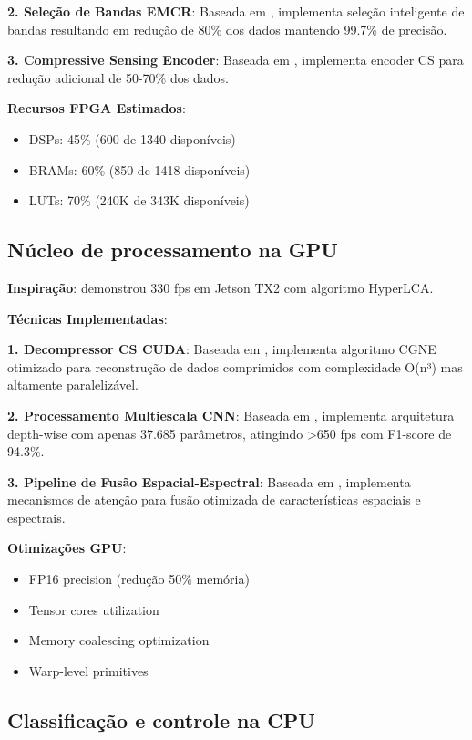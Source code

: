 \textbf{2. Seleção de Bandas EMCR}: Baseada em \textcite{Martins2019}, implementa seleção inteligente de bandas resultando em redução de 80\% dos dados mantendo 99.7\% de precisão.

\textbf{3. Compressive Sensing Encoder}: Baseada em \textcite{Lim2022}, implementa encoder CS para redução adicional de 50-70\% dos dados.

\textbf{Recursos FPGA Estimados}:
\begin{itemize}
    \item DSPs: 45\% (600 de 1340 disponíveis)
    \item BRAMs: 60\% (850 de 1418 disponíveis)
    \item LUTs: 70\% (240K de 343K disponíveis)
\end{itemize}

\subsection{Núcleo de processamento na GPU}\label{subsec:nucleo_processamento_gpu}

\textbf{Inspiração}: \textcite{Diaz2019} demonstrou 330 fps em Jetson TX2 com algoritmo HyperLCA.

\textbf{Técnicas Implementadas}:

\textbf{1. Decompressor CS CUDA}: Baseada em \textcite{Lim2022}, implementa algoritmo CGNE otimizado para reconstrução de dados comprimidos com complexidade O(n³) mas altamente paralelizável.

\textbf{2. Processamento Multiescala CNN}: Baseada em \textcite{TakuNet2024}, implementa arquitetura depth-wise com apenas 37.685 parâmetros, atingindo >650 fps com F1-score de 94.3\%.

\textbf{3. Pipeline de Fusão Espacial-Espectral}: Baseada em \textcite{UAV2024}, implementa mecanismos de atenção para fusão otimizada de características espaciais e espectrais.

\textbf{Otimizações GPU}:
\begin{itemize}
    \item FP16 precision (redução 50\% memória)
    \item Tensor cores utilization
    \item Memory coalescing optimization
    \item Warp-level primitives
\end{itemize}

\subsection{Classificação e controle na CPU}\label{subsec:classificacao_controle_cpu}

